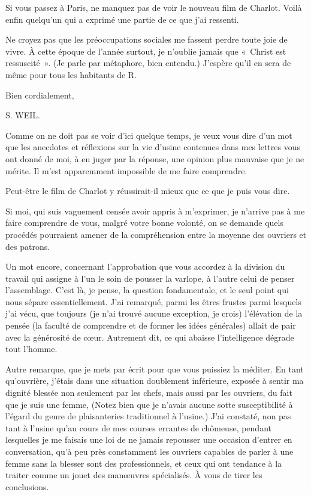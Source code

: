 \documentclass[french,twoside]{book} %
\begin{document}
Si vous passez à Paris, ne manquez pas de voir le nouveau film de Charlot. Voilà enfin quelqu'un qui a exprimé une partie de ce que j'ai ressenti.\par
Ne croyez pas que les préoccupations sociales me fassent perdre toute joie de vivre. À cette époque de l'année surtout, je n'oublie jamais que « Christ est ressuscité ». (Je parle par métaphore, bien entendu.) J'espère qu'il en sera de même pour tous les habitants de R.\par
Bien cordialement,\par
S. WEIL.\par
Comme on ne doit pas se voir d'ici quelque temps, je veux vous dire d'un mot que les anecdotes et réflexions sur la vie d'usine contenues dans mes lettres vous ont donné de moi, à en juger par la réponse, une opinion plus mauvaise que je ne mérite. Il m'est apparemment impossible de me faire comprendre.\par
Peut-être le film de Charlot y réussirait-il mieux que ce que je puis vous dire.\par
Si moi, qui suis vaguement censée avoir appris à m'exprimer, je n'arrive pas à me faire comprendre de vous, malgré votre bonne volonté, on se demande quels procédés pourraient amener de la compréhension entre la moyenne des ouvriers et des patrons.\par
Un mot encore, concernant l'approbation que vous accordez à la division du travail qui assigne à l'un le soin de pousser la varlope, à l'autre celui de penser l'assemblage. C'est là, je pense, la question fondamentale, et le seul point qui nous sépare essentiellement. J'ai remarqué, parmi les êtres frustes parmi lesquels j'ai vécu, que toujours (je n'ai trouvé aucune exception, je crois) l'élévation de la pensée (la faculté de comprendre et de former les idées générales) allait de pair avec la générosité de cœur. Autrement dit, ce qui abaisse l'intelligence dégrade tout l'homme.\par
Autre remarque, que je mets par écrit pour que vous puissiez la méditer. En tant qu'ouvrière, j'étais dans une situation doublement inférieure, exposée à sentir ma dignité blessée non seulement par les chefs, mais aussi par les ouvriers, du fait que je suis une femme, (Notez bien que je n'avais aucune sotte susceptibilité à l'égard du genre de plaisanteries traditionnel à l'usine.) J'ai constaté, non pas tant à l'usine qu'au cours de mes courses errantes de chômeuse, pendant lesquelles je me faisais une loi de ne jamais repousser une occasion d'entrer en conversation, qu'à peu près constamment les ouvriers capables de parler à une femme sans la blesser sont des professionnels, et ceux qui ont tendance à la traiter comme un jouet des manœuvres spécialisés. À vous de tirer les conclusions.\par
\end{document}
